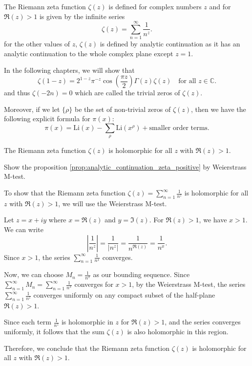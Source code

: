 \documentclass{elegantbook}
\begin{document}
\begin{definition}
  The Riemann zeta function $\zeta(z)$ is defined for complex numbers $z$ and for $\Re(z) > 1$ is given by the infinite series
  \[
    \zeta(z) = \sum_{n=1}^{\infty} \frac{1}{n^z}.
  \]
  for the other values of $z$, $\zeta(z)$ is defined by analytic continuation as it has an analytic continuation to the whole complex plane except $z=1$.

  In the following chapters, we will show that
  \[
    \zeta(1-z) = 2^{1-z} \pi^{-z} \cos\left(\frac{\pi z}{2}\right) \Gamma(z) \zeta(z) \quad \text{for all } z \in \mathbb{C}.
  \]
  and thus $\zeta(-2n)=0$ which are called the trivial zeros of $\zeta(z)$.
\end{definition}

Moreover, if we let $\{\rho\}$ be the set of non-trivial zeros of $\zeta(z)$, then we have the following explicit formula for $\pi(x)$:
\[
  \pi(x) = \mathrm{Li}(x) - \sum_{\rho} \mathrm{Li}(x^{\rho}) + \text{smaller order terms}.
\]

\begin{proposition} \label{prop:analytic_continuation_zeta_positive}
  The Riemann zeta function $\zeta(z)$ is holomorphic for all $z$ with $\Re(z) > 1$.
\end{proposition}

\begin{exercise}
  Show the proposition \ref{prop:analytic_continuation_zeta_positive} by Weierstrass M-test.
\end{exercise}

\begin{solution}
  To show that the Riemann zeta function $\zeta(z) = \sum_{n=1}^{\infty} \frac{1}{n^z}$ is holomorphic for all $z$ with $\Re(z) > 1$, we will use the Weierstrass M-test.

  Let $z = x + iy$ where $x = \Re(z)$ and $y = \Im(z)$. For $\Re(z) > 1$, we have $x > 1$. We can write
  \[
    \left| \frac{1}{n^z} \right| = \frac{1}{|n^z|} = \frac{1}{n^{\Re(z)}} = \frac{1}{n^x}.
  \]
  Since $x > 1$, the series $\sum_{n=1}^{\infty} \frac{1}{n^x}$ converges. 

  Now, we can choose $M_n = \frac{1}{n^x}$ as our bounding sequence. Since $\sum_{n=1}^{\infty} M_n = \sum_{n=1}^{\infty} \frac{1}{n^x}$ converges for $x > 1$, by the Weierstrass M-test, the series $\sum_{n=1}^{\infty} \frac{1}{n^z}$ converges uniformly on any compact subset of the half-plane $\Re(z) > 1$.

  Since each term $\frac{1}{n^z}$ is holomorphic in $z$ for $\Re(z) > 1$, and the series converges uniformly, it follows that the sum $\zeta(z)$ is also holomorphic in this region.

  Therefore, we conclude that the Riemann zeta function $\zeta(z)$ is holomorphic for all $z$ with $\Re(z) > 1$.
\end{solution}
\end{document}
